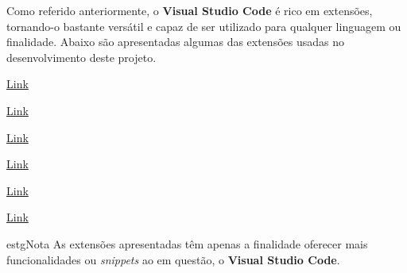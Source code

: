 Como referido anteriormente, o \textbf{Visual Studio Code} é rico em extensões, tornando-o bastante versátil e capaz de ser utilizado para qualquer linguagem ou finalidade. Abaixo são apresentadas algumas das extensões usadas no desenvolvimento deste projeto.

\begin{minipage}[t]{0.5\textwidth}
	\centering
	
	\href{https://marketplace.visualstudio.com/items?itemName=dsznajder.es7-react-js-snippets}{Link}
\end{minipage}
\begin{minipage}[t]{0.5\textwidth}
	\centering
	
	\href{https://marketplace.visualstudio.com/items?itemName=steoates.autoimport}{Link}
\end{minipage}

\vspace{0.25cm}

\begin{minipage}[t]{0.5\textwidth}
	\centering
	
	\href{https://marketplace.visualstudio.com/items?itemName=formulahendry.auto-close-tag}{Link}
\end{minipage}
\begin{minipage}[t]{0.5\textwidth}
	\centering
	
	\href{https://marketplace.visualstudio.com/items?itemName=formulahendry.auto-rename-tag}{Link}
\end{minipage}

\vspace{0.25cm}

\begin{minipage}[t]{0.5\textwidth}
	\centering
	
	\href{https://marketplace.visualstudio.com/items?itemName=dbaeumer.vscode-eslint}{Link}
\end{minipage}
\begin{minipage}[t]{0.5\textwidth}
	\centering
	
	\href{https://marketplace.visualstudio.com/items?itemName=Syler.sass-indented}{Link}
\end{minipage}

\begin{mybox}{estg}{Nota}
	As extensões apresentadas têm apenas a finalidade oferecer mais funcionalidades ou \textit{snippets} ao  em questão, o \textbf{Visual Studio Code}.
\end{mybox}
